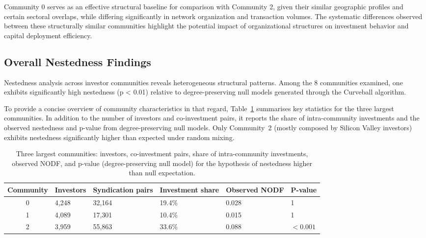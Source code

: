 Community 0 serves as an effective structural baseline for comparison with Community 2, given their similar geographic profiles and certain sectoral overlaps, while differing significantly in network organization and transaction volumes. The systematic differences observed between these structurally similar communities highlight the potential impact of organizational structures on investment behavior and capital deployment efficiency.

\subsection{Overall Nestedness Findings}

\newcommand{\numCommAnalysedNestedness}{8}

Nestedness analysis across investor communities reveals heterogeneous structural patterns. Among the \numCommAnalysedNestedness{} communities examined, one exhibits significantly high nestedness (p < 0.01) relative to degree-preserving null models generated through the Curveball algorithm.

To provide a concise overview of community characteristics in that regard, Table~\ref{tab:community_summary} summarises key statistics for the three largest communities. In addition to the number of investors and co-investment pairs, it reports the share of intra-community investments and the observed nestedness and p-value from degree-preserving null models. Only Community~2 (mostly composed by Silicon Valley investors) exhibits nestedness significantly higher than expected under random mixing.

\begin{table}[ht]
\centering
\renewcommand{\arraystretch}{1.2}
\begin{tabular}{|c|p{2.2cm}|p{2.7cm}|p{2.7cm}|p{2.2cm}|p{2.2cm}|}
\hline
\textbf{Community} & \textbf{Investors} & \textbf{Syndication pairs} & \textbf{Investment share} & \textbf{Observed NODF} & \textbf{P-value} \\
\hline
0 & 4{,}248 & 32{,}164 & 19.4\% & 0.028 & 1 \\
1 & 4{,}089 & 17{,}301 & 10.4\% & 0.015 & 1 \\
2 & 3{,}959 & 55{,}863 & 33.6\% & 0.088 & $<\!0.001$ \\
\hline
\end{tabular}
\caption{Three largest communities: investors, co-investment pairs, share of intra-community investments, observed NODF, and p-value (degree-preserving null model) for the hypothesis of nestedness higher than null expectation.}
\label{tab:community_summary}
\end{table}


